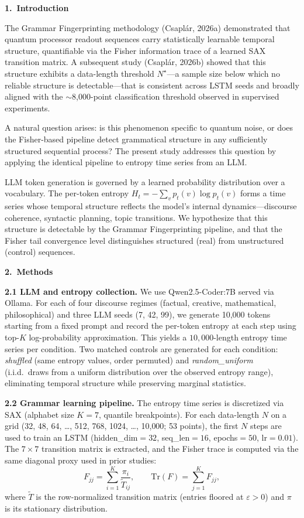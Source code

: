 \documentclass[11pt,a4paper]{article}
\begin{document}
\vspace{0.8em}
\textbf{1.\ Introduction}

The Grammar Fingerprinting methodology (Csapl\'ar, 2026a) demonstrated that quantum processor readout sequences carry statistically learnable temporal structure, quantifiable via the Fisher information trace of a learned SAX transition matrix. A subsequent study (Csapl\'ar, 2026b) showed that this structure exhibits a data-length threshold $N^\star$---a sample size below which no reliable structure is detectable---that is consistent across LSTM seeds and broadly aligned with the $\sim$8{,}000-point classification threshold observed in supervised experiments.

A natural question arises: is this phenomenon specific to quantum noise, or does the Fisher-based pipeline detect grammatical structure in any sufficiently structured sequential process? The present study addresses this question by applying the identical pipeline to entropy time series from an LLM.

LLM token generation is governed by a learned probability distribution over a vocabulary. The per-token entropy $H_t = -\sum_v p_t(v)\log p_t(v)$ forms a time series whose temporal structure reflects the model's internal dynamics---discourse coherence, syntactic planning, topic transitions. We hypothesize that this structure is detectable by the Grammar Fingerprinting pipeline, and that the Fisher tail convergence level distinguishes structured (real) from unstructured (control) sequences.

\vspace{0.5em}
\textbf{2.\ Methods}

\textbf{2.1 LLM and entropy collection.} We use Qwen2.5-Coder:7B served via Ollama. For each of four discourse regimes (factual, creative, mathematical, philosophical) and three LLM seeds (7, 42, 99), we generate 10{,}000 tokens starting from a fixed prompt and record the per-token entropy at each step using top-$K$ log-probability approximation. This yields a $10{,}000$-length entropy time series per condition. Two matched controls are generated for each condition: \emph{shuffled} (same entropy values, order permuted) and \emph{random\_uniform} (i.i.d.\ draws from a uniform distribution over the observed entropy range), eliminating temporal structure while preserving marginal statistics.

\textbf{2.2 Grammar learning pipeline.} The entropy time series is discretized via SAX (alphabet size $K=7$, quantile breakpoints). For each data-length $N$ on a grid (32, 48, 64, \ldots, 512, 768, 1024, \ldots, 10{,}000; 53 points), the first $N$ steps are used to train an LSTM (hidden\_dim$=32$, seq\_len$=16$, epochs$=50$, lr$=0.01$). The $7\times7$ transition matrix is extracted, and the Fisher trace is computed via the same diagonal proxy used in prior studies:
\begin{equation}
F_{jj}=\sum_{i=1}^{K}\frac{\pi_i}{\tilde{T}_{ij}}, \qquad
\mathrm{Tr}(F)=\sum_{j=1}^{K}F_{jj},
\label{eq:fisher}
\end{equation}
where $\tilde{T}$ is the row-normalized transition matrix (entries floored at $\varepsilon>0$) and $\pi$ is its stationary distribution.
\end{document}
